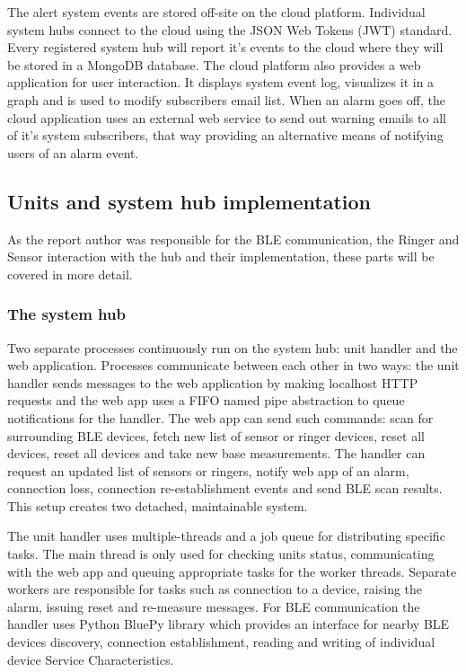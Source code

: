 \documentclass[conference]{IEEEtran}
\begin{document}
The alert system events are stored off-site on the cloud platform. Individual system hubs connect to the cloud using the JSON Web Tokens (JWT) standard. Every registered system hub will report it's events to the cloud where they will be stored in a MongoDB database. The cloud platform also provides a web application for user interaction. It displays system event log, visualizes it in a graph and is used to modify subscribers email list. When an alarm goes off, the cloud application uses an external web service to send out warning emails to all of it's system subscribers, that way providing an alternative means of notifying users of an alarm event.


\subsection{Units and system hub implementation}
As the report author was responsible for the BLE communication, the Ringer and Sensor interaction with the hub and their implementation, these parts will be covered in more detail.

\subsubsection{The system hub}

Two separate processes continuously run on the system hub: unit handler and the web application. Processes communicate between each other in two ways: the unit handler sends messages to the web application by making localhost HTTP requests and the web app uses a FIFO named pipe abstraction to queue notifications for the handler. The web app can send such commands: scan for surrounding BLE devices, fetch new list of sensor or ringer devices, reset all devices, reset all devices and take new base measurements. The handler can request an updated list of sensors or ringers, notify web app of an alarm, connection loss, connection re-establishment events and send BLE scan results. This setup creates two detached, maintainable system.

The unit handler uses multiple-threads and a job queue for distributing specific tasks. The main thread is only used for checking units status, communicating with the web app and queuing appropriate tasks for the worker threads. Separate workers are responsible for tasks such as connection to a device, raising the alarm, issuing reset and re-measure messages. For BLE communication the handler uses Python BluePy library which provides an interface for nearby BLE devices discovery, connection establishment, reading and writing of individual device Service Characteristics.
\end{document}
